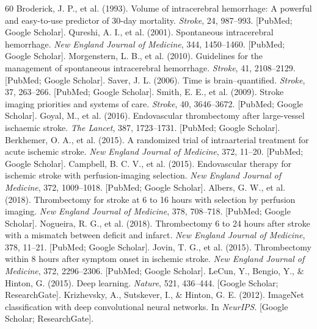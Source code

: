 \documentclass[10pt,a4paper]{article}
\begin{document}
\begin{thebibliography}{60}
 Broderick, J. P., et al. (1993). Volume of intracerebral hemorrhage: A powerful and easy-to-use predictor of 30-day mortality. \textit{Stroke}, 24, 987--993. [PubMed; Google Scholar].
 Qureshi, A. I., et al. (2001). Spontaneous intracerebral hemorrhage. \textit{New England Journal of Medicine}, 344, 1450--1460. [PubMed; Google Scholar].
 Morgenstern, L. B., et al. (2010). Guidelines for the management of spontaneous intracerebral hemorrhage. \textit{Stroke}, 41, 2108--2129. [PubMed; Google Scholar].
 Saver, J. L. (2006). Time is brain--quantified. \textit{Stroke}, 37, 263--266. [PubMed; Google Scholar].
 Smith, E. E., et al. (2009). Stroke imaging priorities and systems of care. \textit{Stroke}, 40, 3646--3672. [PubMed; Google Scholar].
 Goyal, M., et al. (2016). Endovascular thrombectomy after large-vessel ischaemic stroke. \textit{The Lancet}, 387, 1723--1731. [PubMed; Google Scholar].
 Berkhemer, O. A., et al. (2015). A randomized trial of intraarterial treatment for acute ischemic stroke. \textit{New England Journal of Medicine}, 372, 11--20. [PubMed; Google Scholar].
 Campbell, B. C. V., et al. (2015). Endovascular therapy for ischemic stroke with perfusion-imaging selection. \textit{New England Journal of Medicine}, 372, 1009--1018. [PubMed; Google Scholar].
 Albers, G. W., et al. (2018). Thrombectomy for stroke at 6 to 16 hours with selection by perfusion imaging. \textit{New England Journal of Medicine}, 378, 708--718. [PubMed; Google Scholar].
 Nogueira, R. G., et al. (2018). Thrombectomy 6 to 24 hours after stroke with a mismatch between deficit and infarct. \textit{New England Journal of Medicine}, 378, 11--21. [PubMed; Google Scholar].
 Jovin, T. G., et al. (2015). Thrombectomy within 8 hours after symptom onset in ischemic stroke. \textit{New England Journal of Medicine}, 372, 2296--2306. [PubMed; Google Scholar].
 LeCun, Y., Bengio, Y., \& Hinton, G. (2015). Deep learning. \textit{Nature}, 521, 436--444. [Google Scholar; ResearchGate].
 Krizhevsky, A., Sutskever, I., \& Hinton, G. E. (2012). ImageNet classification with deep convolutional neural networks. In \textit{NeurIPS}. [Google Scholar; ResearchGate].

\end{thebibliography}
\end{document}
